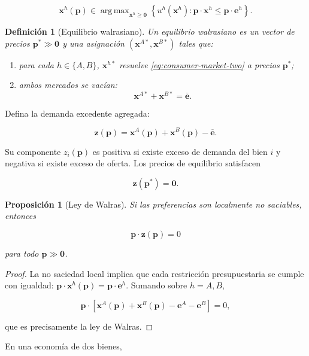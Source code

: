 \documentclass[12pt]{article}
\theoremstyle{cideplain}
\newtheorem{proposition}[theorem]{Proposición}
\theoremstyle{cidedef}
\newtheorem{definition}[theorem]{Definición}
\DeclareMathOperator*{\argmax}{arg\,max}
\newcommand{\p}{\bm p}
\newcommand{\e}{\bm e}
\newcommand{\x}{\bm x}
\newcommand{\z}{\bm z}
\begin{document}
\begin{equation}
  \x^h(\p)
  \in
  \argmax_{\x^h\geq\bm 0}
  \left\{
    u^h(\x^h):
    \p\cdot\x^h\leq\p\cdot\e^h
  \right\}.
  \label{eq:consumer-market-two}
\end{equation}

\begin{definition}[Equilibrio walrasiano]
Un equilibrio walrasiano es un vector de precios \(\p^*\gg\bm 0\) y una asignación
\((\x^{A*},\x^{B*})\) tales que:

\begin{enumerate}
  \item para cada \(h\in\{A,B\}\), \(\x^{h*}\) resuelve
  \eqref{eq:consumer-market-two} a precios \(\p^*\);
  \item ambos mercados se vacían:
  \begin{equation}
    \x^{A*}+\x^{B*}=\overline{\e}.
    \label{eq:market-clearing-two}
  \end{equation}
\end{enumerate}
\end{definition}

Defina la demanda excedente agregada:

\begin{equation}
  \z(\p)
  =
  \x^A(\p)+\x^B(\p)-\overline{\e}.
  \label{eq:excess-demand-two}
\end{equation}

Su componente \(z_i(\p)\) es positiva si existe exceso de demanda del bien \(i\) y negativa
si existe exceso de oferta. Los precios de equilibrio satisfacen

\[
  \z(\p^*)=\bm 0.
\]

\begin{proposition}[Ley de Walras]
Si las preferencias son localmente no saciables, entonces

\[
  \p\cdot\z(\p)=0
\]

para todo \(\p\gg\bm 0\).
\end{proposition}

\begin{proof}
La no saciedad local implica que cada restricción presupuestaria se cumple con igualdad:
\(\p\cdot\x^h(\p)=\p\cdot\e^h\). Sumando sobre \(h=A,B\),

\[
  \p\cdot
  \left[
    \x^A(\p)+\x^B(\p)-\e^A-\e^B
  \right]
  =0,
\]

que es precisamente la ley de Walras.
\end{proof}

En una economía de dos bienes,
\end{document}
